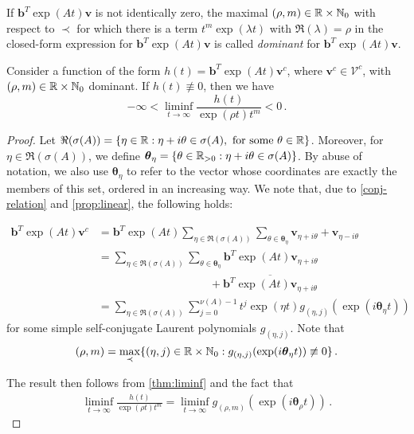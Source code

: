 \begin{definition}
If $\boldsymbol{b}^{T}\exp(At)\boldsymbol{v}$ is not identically zero,
the maximal $(\rho,m)\in\mathbb{R}\times\mathbb{N}_{0}$ with respect
to $\prec$ for which there is a term $t^{m}\exp (\lambda t)$ with
$\Re(\lambda)=\rho$ in the closed-form expression for
$\boldsymbol{b}^{T}\exp(At)\boldsymbol{v}$ is called \emph{dominant} for
$\boldsymbol{b}^{T}\exp(At)\boldsymbol{v}$.
\end{definition}

\begin{proposition}
\label{liminfprop}
Consider a function of the form $h(t)=\boldsymbol{b}^{T}\exp(At) \boldsymbol{v}^{c}$, where $\boldsymbol{v}^{c}\in\mathcal{V}^{c}$, with $(\rho,m)\in\mathbb{R}\times \mathbb{N}_{0}$ dominant. If $h(t)\not\equiv 0$, then we have
\begin{equation*}
-\infty<\liminf\limits_{t\rightarrow\infty} \frac{h(t)}{\exp(\rho
  t)t^{m}}<0 \, .
\end{equation*}
\end{proposition}

\begin{proof}
  Let
  $\Re(\sigma(A))=\lbrace \eta\in\mathbb{R}:
  \eta+i\theta\in\sigma(A),\mbox{ for some }\theta\in\mathbb{R}
  \rbrace$. Moreover, for $\eta\in\Re(\sigma(A))$, we define
  $\boldsymbol{\theta}_{\eta}=\lbrace \theta\in\mathbb{R}_{>0}:
  \eta+i\theta \in\sigma(A) \rbrace$. By abuse of notation, we also
  use $\boldsymbol{\theta}_{\eta}$ to refer to the vector whose
  coordinates are exactly the members of this set, ordered in an
  increasing way. We note that, due to \cref{conj-relation}
  and \cref{prop:linear}, the
  following holds:

\begin{align*}
\boldsymbol{b}^{T}\exp(At)\boldsymbol{v}^{c} &= \boldsymbol{b}^{T} \exp(At) \sum\limits_{\eta\in\Re(\sigma(A))} \sum\limits_{\theta\in\boldsymbol{\theta}_{\eta}} \boldsymbol{v}_{\eta+i\theta}+\boldsymbol{v}_{\eta-i\theta} \\
&= \sum\limits_{\eta\in\Re(\sigma(A))} \sum\limits_{\theta\in\boldsymbol{\theta}_{\eta}} \boldsymbol{b}^{T} \exp(At) \boldsymbol{v}_{\eta+i\theta} \\
& \qquad \qquad \qquad \qquad \qquad + \overline{\boldsymbol{b}^{T} \exp(At) \boldsymbol{v}_{\eta+i\theta}} \\
& = \sum\limits_{\eta\in\Re(\sigma(A))} \sum\limits_{j=0}^{\nu(A)-1} t^{j}\exp(\eta t)  g_{(\eta,j)}( \exp(i\boldsymbol{\theta}_{\eta}t) )
\end{align*}
for some simple self-conjugate Laurent polynomials
$g_{(\eta,j)}$.
Note that
\begin{equation*}
(\rho,m)=\max\limits_{\prec} \lbrace (\eta,j)\in\mathbb{R}\times
\mathbb{N}_{0}: g_{(\eta,j)}(\exp(i\boldsymbol{\theta}_{\eta} t)) \not
\equiv 0 \rbrace \, .
\end{equation*}

The result then follows from \cref{thm:liminf} and the fact
that
\begin{align*}
\liminf\limits_{t\rightarrow\infty} \frac{h(t)}{\exp(\rho t)t^{m}}=
  \liminf\limits_{t\rightarrow\infty}
  g_{(\rho,m)}(\exp(i\boldsymbol{\theta}_{\rho} t)) \, .
\end{align*}
\end{proof}
